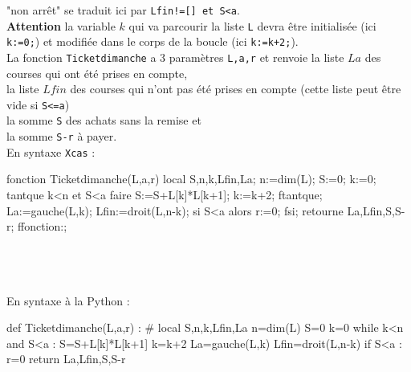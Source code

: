 \documentclass[12pt,a4paper]{book}
\begin{document}
\begin{giacjshere}
"non arr\^et" se traduit ici par {\tt Lfin!=[] et S<a}.\\
{\bf Attention} la variable $k$ qui va parcourir la liste {\tt L} devra \^etre 
initialis\'ee (ici {\tt k:=0;}) et modifi\'ee dans le corps de la boucle (ici 
{\tt k:=k+2;}).\\
La fonction {\tt Ticketdimanche} a 3 param\`etres {\tt L,a,r} et renvoie
la liste $La$ des courses qui ont \'et\'e prises en compte,\\
la liste $Lfin$ des courses qui n'ont pas \'et\'e prises en compte (cette liste peut \^etre vide si {\tt S<=a})\\
la somme {\tt S} des achats sans la remise et\\
la somme {\tt S-r} \`a payer.\\
En syntaxe {\tt Xcas} :
\begin{giaconload}
fonction Ticketdimanche(L,a,r) 
 local S,n,k,Lfin,La; 
 n:=dim(L);
 S:=0;
 k:=0;
 tantque k<n et S<a faire 
   S:=S+L[k]*L[k+1];
   k:=k+2;
 ftantque;
 La:=gauche(L,k);
 Lfin:=droit(L,n-k);
 si S<a alors r:=0; fsi;
 retourne La,Lfin,S,S-r;
ffonction:;
\end{giaconload}
\\
\\
\\
En syntaxe \`a la Python :
\begin{giacprog}
def Ticketdimanche(L,a,r) :
    # local S,n,k,Lfin,La 
    n=dim(L)
    S=0
    k=0
    while k<n and S<a : 
        S=S+L[k]*L[k+1]
        k=k+2
    La=gauche(L,k)
    Lfin=droit(L,n-k)
    if S<a :
        r=0
    return La,Lfin,S,S-r
\end{giacprog}
\\
\\
\\


\end{giacjshere}
\end{document}
